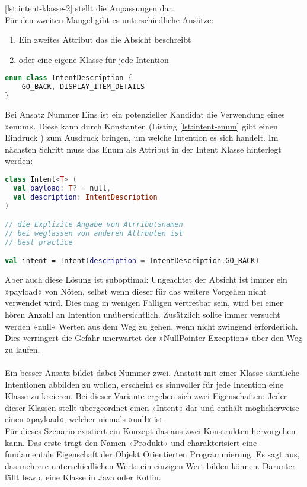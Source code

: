 \ref{lst:intent-klasse-2}
stellt die Anpassungen dar.
\\
Für den zweiten Mangel gibt es unterschiedliche Ansätze:
\begin{enumerate}
	\item Ein zweites Attribut das die Absicht beschreibt
	\item oder eine eigene Klasse für jede Intention
\end{enumerate}
\begin{lstlisting}[caption={Intent Enum}, label={lst:intent-enum}, language=Kotlin]
enum class IntentDescription {
	GO_BACK, DISPLAY_ITEM_DETAILS
}
\end{lstlisting}
\bigskip
Bei Ansatz Nummer Eins ist ein potenzieller Kandidat die Verwendung eines »enum«. Diese kann durch Konstanten (Listing 
\ref{lst:intent-enum} gibt einen Eindruck
) zum Ausdruck bringen, um welche Intention es sich handelt. Im nächsten Schritt muss das Enum als Attribut in der Intent Klasse hinterlegt werden:
\begin{lstlisting}[caption={Intent Klasse}, label={lst:intent-klasse-2}, language=Kotlin]
class Intent<T> (
  val payload: T? = null, 
  val description: IntentDescription
)

// die Explizite Angabe von Atrributsnamen
// bei weglassen von anderen Attrbuten ist
// best practice

val intent = Intent(description = IntentDescription.GO_BACK)
\end{lstlisting}
\bigskip
Aber auch diese Lösung ist suboptimal: Ungeachtet der Absicht ist immer ein »payload« von Nöten, selbst wenn dieser für das weitere Vorgehen nicht verwendet wird. Dies mag in wenigen Fälligen vertretbar sein, wird bei einer hören Anzahl an Intention unübersichtlich. Zusätzlich sollte immer versucht werden »null« Werten aus dem Weg zu gehen, wenn nicht zwingend erforderlich. Dies verringert die Gefahr unerwartet der »NullPointer Exception« über den Weg zu laufen.
\\
\\
Ein besser Ansatz bildet dabei Nummer zwei. Anstatt mit einer Klasse sämtliche Intentionen abbilden zu wollen, erscheint es sinnvoller für jede Intention eine Klasse zu kreieren. Bei dieser Variante ergeben sich zwei Eigenschaften: Jeder dieser Klassen stellt übergeordnet einen »Intent« dar und enthält möglicherweise einen »payload«, welcher niemals »null« ist.
\\
Für dieses Szenario existiert ein Konzept das aus zwei Konstrukten hervorgehen kann. Das erste trägt den Namen »Produkt« und charakterisiert eine fundamentale Eigenschaft der Objekt Orientierten Programmierung. Es sagt aus, das mehrere unterschiedlichen Werte ein einzigen Wert bilden können. Darunter fällt bswp. eine Klasse in Java oder Kotlin.
